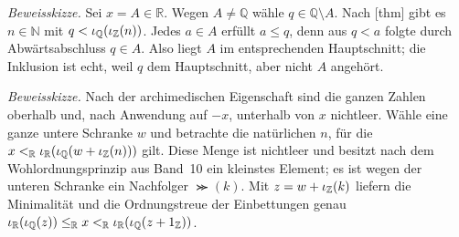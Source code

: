 \documentclass[main.tex]{subfiles}
\begin{document}


\emph{Beweisskizze.}
Sei \(x=A\in\mathbb R\). Wegen \(A\neq\mathbb Q\) wähle
\(q\in\mathbb Q\setminus A\). Nach
[thm] gibt es \(n\in\mathbb N\) mit
\(q<\iota_{\mathbb Q}(\iota_{\mathbb{Z}}(n))\). Jedes \(a\in A\) erfüllt \(a\leq q\), denn
aus \(q<a\) folgte durch Abwärtsabschluss \(q\in A\). Also liegt \(A\) im
entsprechenden Hauptschnitt; die Inklusion ist echt, weil \(q\) dem
Hauptschnitt, aber nicht \(A\) angehört.


\emph{Beweisskizze.}
Nach der archimedischen Eigenschaft sind die ganzen Zahlen oberhalb und,
nach Anwendung auf \(-x\), unterhalb von \(x\) nichtleer. Wähle eine ganze
untere Schranke \(w\) und betrachte die natürlichen \(n\), für die
\(x\mathrel{<_{\mathbb R}}\iota_{\mathbb R}(\iota_{\mathbb Q}(w+\iota_{\mathbb{Z}}(n)))\) gilt. Diese Menge ist
nichtleer und besitzt nach dem Wohlordnungsprinzip aus Band~10 ein kleinstes
Element; es ist wegen der unteren Schranke ein Nachfolger \(\Succ(k)\).
Mit \(z=w+\iota_{\mathbb{Z}}(k)\) liefern die Minimalität und die Ordnungstreue der
Einbettungen genau
\(\iota_{\mathbb R}(\iota_{\mathbb Q}(z))\mathrel{\leq_{\mathbb R}} x
\mathrel{<_{\mathbb R}}\iota_{\mathbb R}(\iota_{\mathbb Q}(z+1_{\mathbb Z}))\).
\end{document}
